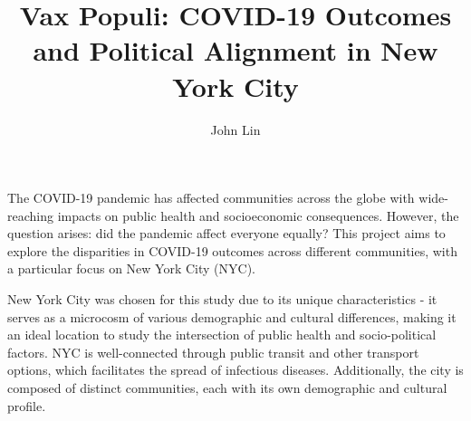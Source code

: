 \documentclass[10pt,journal,compsoc]{IEEEtran}
\title{Vax Populi: COVID-19 Outcomes and Political Alignment in New York City}
\author{John Lin%
}
\newif\ifpeerreview
\newcommand{\paperID}{XXXX}
\begin{document}


\ifpeerreview
\linenumbers \linenumbersep 15pt\relax 
\author{Paper ID \paperID\IEEEcompsocitemizethanks{\IEEEcompsocthanksitem This paper is under review for ICCP 2020 and the PAMI special issue on computational photography. Do not distribute.}}
\markboth{Anonymous ICCP 2020 submission ID \paperID}%
{}
\fi
\maketitle



% 
% 
% 
% 
The COVID-19 pandemic has affected communities across the globe with wide-reaching impacts on public health and socioeconomic consequences. However, the question arises: did the pandemic affect everyone equally? This project aims to explore the disparities in COVID-19 outcomes across different communities, with a particular focus on New York City (NYC).

New York City was chosen for this study due to its unique characteristics - it serves as a microcosm of various demographic and cultural differences, making it an ideal location to study the intersection of public health and socio-political factors. NYC is well-connected through public transit and other transport options, which facilitates the spread of infectious diseases. Additionally, the city is composed of distinct communities, each with its own demographic and cultural profile.
\end{document}
